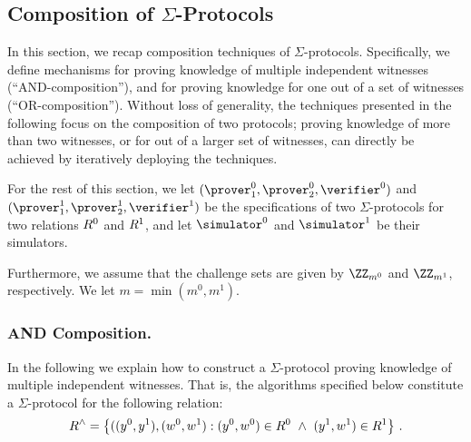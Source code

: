 \documentclass[runningheads]{llncs}
\begin{document}
\subsection{Composition of $\Sigma$-Protocols}
  In this section, we recap composition techniques of $\Sigma$-protocols.
  Specifically, we define mechanisms for proving knowledge of multiple independent witnesses (``AND-composition''), and for proving knowledge for one out of a set of witnesses (``OR-composition'').
  Without loss of generality, the techniques presented in the following focus on the composition of two protocols;
  proving knowledge of more than two witnesses, or for out of a larger set of witnesses, can directly be achieved by iteratively deploying the techniques.

  For the rest of this section, we let $(\prover_1^0,\prover_2^0,\verifier^0)$ and $(\prover_1^1,\prover_2^1,\verifier^1)$ be the specifications of two $\Sigma$-protocols for two relations $R^0$ and $R^1$, and let $\simulator^0$ and $\simulator^1$ be their simulators.

  Furthermore, we assume that the challenge sets are given by $\ZZ_{m^0}$ and $\ZZ_{m^1}$, respectively.
  We let $m=\min(m^0,m^1)$.


\subsubsection{AND Composition.}
  In the following we explain how to construct a $\Sigma$-protocol proving knowledge of multiple independent witnesses.
  That is, the algorithms specified below constitute a $\Sigma$-protocol for the following relation:
$$
  R^\land = \left\{ ((y^0,y^1),(w^0,w^1) : (y^0,w^0)\in R^0 ~\land~ (y^1,w^1)\in R^1\right\}\,.
$$
\end{document}
